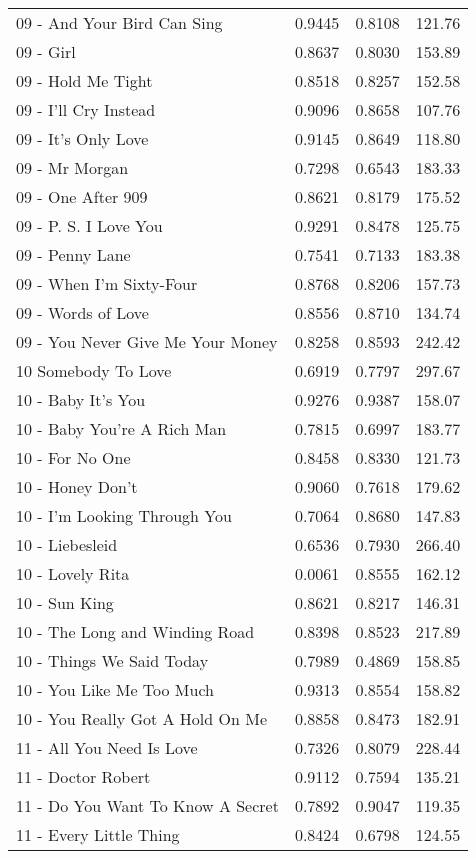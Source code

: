 \begin{longtable}[c]{|l|c|l|l|}
09 - And Your Bird Can Sing & 0.9445 & 0.8108 & 121.76 \\
09 - Girl & 0.8637 & 0.8030 & 153.89 \\
09 - Hold Me Tight & 0.8518 & 0.8257 & 152.58 \\
09 - I'll Cry Instead & 0.9096 & 0.8658 & 107.76 \\
09 - It's Only Love & 0.9145 & 0.8649 & 118.80 \\
09 - Mr Morgan & 0.7298 & 0.6543 & 183.33 \\
09 - One After 909 & 0.8621 & 0.8179 & 175.52 \\
09 - P. S. I Love You & 0.9291 & 0.8478 & 125.75 \\
09 - Penny Lane & 0.7541 & 0.7133 & 183.38 \\
09 - When I'm Sixty-Four & 0.8768 & 0.8206 & 157.73 \\
09 - Words of Love & 0.8556 & 0.8710 & 134.74 \\
09 - You Never Give Me Your Money & 0.8258 & 0.8593 & 242.42 \\
10 Somebody To Love & 0.6919 & 0.7797 & 297.67 \\
10 - Baby It's You & 0.9276 & 0.9387 & 158.07 \\
10 - Baby You're A Rich Man & 0.7815 & 0.6997 & 183.77 \\
10 - For No One & 0.8458 & 0.8330 & 121.73 \\
10 - Honey Don't & 0.9060 & 0.7618 & 179.62 \\
10 - I'm Looking Through You & 0.7064 & 0.8680 & 147.83 \\
10 - Liebesleid & 0.6536 & 0.7930 & 266.40 \\
10 - Lovely Rita & 0.0061 & 0.8555 & 162.12 \\
10 - Sun King & 0.8621 & 0.8217 & 146.31 \\
10 - The Long and Winding Road & 0.8398 & 0.8523 & 217.89 \\
10 - Things We Said Today & 0.7989 & 0.4869 & 158.85 \\
10 - You Like Me Too Much & 0.9313 & 0.8554 & 158.82 \\
10 - You Really Got A Hold On Me & 0.8858 & 0.8473 & 182.91 \\
11 - All You Need Is Love & 0.7326 & 0.8079 & 228.44 \\
11 - Doctor Robert & 0.9112 & 0.7594 & 135.21 \\
11 - Do You Want To Know A Secret & 0.7892 & 0.9047 & 119.35 \\
11 - Every Little Thing & 0.8424 & 0.6798 & 124.55 \\

\end{longtable}

